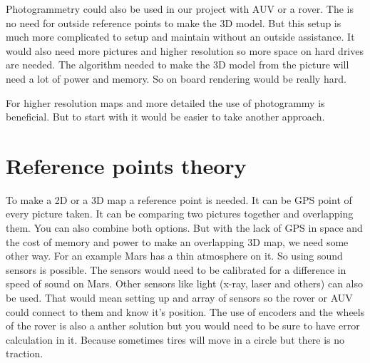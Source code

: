 Photogrammetry could also be used in our project with AUV or a rover. The is no need for outside reference points to make the 3D model. But this setup is much more complicated to setup and maintain without an outside assistance. It would also need more pictures and higher resolution so more space on hard drives are needed. The algorithm needed to make the 3D model from the picture will need a lot of power and memory. So on board rendering would be really hard.

For higher resolution maps and more detailed the use of photogrammy is beneficial. But to start with it would be easier to take another approach.

\section{Reference points theory}

To make a 2D or a 3D map a reference point is needed. It can be GPS point of every picture taken. It can be comparing two pictures together and overlapping them. You can also combine both options. But with the lack of GPS in space and the cost of memory and power to make an overlapping 3D map, we need some other way. For an example Mars has a thin atmosphere on it. So using sound sensors is possible. The sensors would need to be calibrated for a difference in speed of sound on Mars. Other sensors like light (x-ray, laser and others) can also be used. That would mean setting up and array of sensors so the rover or AUV could connect to them and know it's position. The use of encoders and the wheels of the rover is also a anther solution but you would need to be sure to have error calculation in it. Because sometimes tires will move in a circle but there is no traction.\cite{reference} 




















